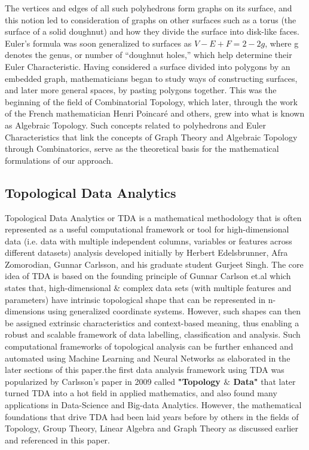 The vertices and edges of all such polyhedrons form graphs on its surface, and this notion led to consideration of graphs on other surfaces such as a torus (the surface of a solid doughnut) and how they divide the surface into disk-like faces. Euler’s formula was soon generalized to surfaces as $V-E+F=2-2g$, where g denotes the genus, or number of “doughnut holes,” which help determine their Euler Characteristic. \cite{01.18_EulerFormula} Having considered a surface divided into polygons by an embedded graph, mathematicians began to study ways of constructing surfaces, and later more general spaces, by pasting polygons together. This was the beginning of the field of Combinatorial Topology, which later, through the work of the French mathematician Henri Poincaré and others, grew into what is known as Algebraic Topology.  \cite{01.1_1stCourse2018algebraicTopo} \cite{01.11_1999historyofTopo} \cite{01.12_2013TopoHistHandbook}Such concepts related to polyhedrons and Euler Characteristics that link the concepts of Graph Theory and Algebraic Topology through Combinatorics, serve as the theoretical basis for the mathematical formulations of our approach.

\subsection{Topological Data Analytics}

Topological Data Analytics or TDA \cite{02.3_2017introductionTDA} \cite{01_GCarlssonEpstein2011} is a mathematical methodology that is often represented as a useful computational framework or tool for high-dimensional data (i.e. data with multiple independent columns, variables or features across different datasets) analysis developed initially by Herbert Edelsbrunner, Afra Zomorodian, Gunnar Carlsson, and his graduate student Gurjeet Singh.\cite{01.9_2007MapperPBG} \cite{02.1_GCarlson2004topoEstimation} \cite{01_GCarlssonEpstein2011}The core idea of TDA  is based on the founding principle of Gunnar Carlson et.al\cite{02.4_TDAResearch} which states that, high-dimensional \& complex data sets (with multiple features and parameters) have intrinsic topological shape that can be represented in n-dimensions using generalized coordinate systems.\cite{01_GCarlssonEpstein2011} However, such shapes can then be assigned extrinsic characteristics and context-based meaning, thus enabling a robust and scalable framework of data labelling, classification and analysis. Such computational frameworks of topological analysis can be further enhanced and automated using Machine Learning and Neural Networks as elaborated in the later sections of this paper.the first data analysis framework using TDA was popularized by Carlsson’s paper in 2009  called \textbf{"Topology $\&$ Data"} \cite{02_carlsson2009topology} that later turned TDA into a hot field in applied mathematics, and also found many applications in Data-Science and Big-data Analytics.\cite{02.6_2009TDAChallenges}\cite{18.2_2018TDAonBigData} \cite{17.1_2012foundationsTGT} However, the mathematical foundations that drive TDA had been laid years before by others in the fields of Topology, Group Theory, Linear Algebra and Graph Theory as discussed earlier and referenced in this paper.


